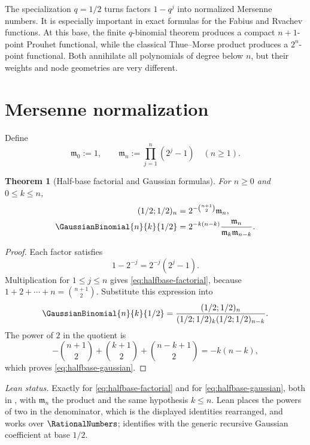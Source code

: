 \documentclass[11pt,a4paper,oneside,openany]{book}
\newtheorem{theorem}{Theorem}[chapter]
\theoremstyle{definition}
\theoremstyle{remark}
\begin{document}
The specialization $q=1/2$ turns factors $1-q^j$ into normalized Mersenne numbers.  It is especially important in exact formulas for the Fabius and Rvachev functions.  At this base, the finite $q$-binomial theorem produces a compact $n+1$-point Prouhet functional, while the classical Thue--Morse product produces a $2^n$-point functional.  Both annihilate all polynomials of degree below $n$, but their weights and node geometries are very different.

\section{Mersenne normalization}

Define
\begin{equation}\label{eq:mersenne-product}
 \mathfrak m_0:=1,
 \qquad
 \mathfrak m_n:=\prod_{j=1}^{n}(2^j-1)
 \quad(n\ge1).
\end{equation}

\begin{theorem}[Half-base factorial and Gaussian formulas]\label{thm:halfbase-normalization}
For $n\ge0$ and $0\le k\le n$,
\begin{align}
 (1/2;1/2)_n
 &=2^{-\binom{n+1}{2}}\mathfrak m_n,
 \label{eq:halfbase-factorial}\\
 \GaussianBinomial{n}{k}{1/2}
 &=2^{-k(n-k)}
   \frac{\mathfrak m_n}{\mathfrak m_k\mathfrak m_{n-k}}.
 \label{eq:halfbase-gaussian}
\end{align}
\end{theorem}

\begin{proof}
Each factor satisfies
\[
 1-2^{-j}=2^{-j}(2^j-1).
\]
Multiplication for $1\le j\le n$ gives \eqref{eq:halfbase-factorial}, because
$1+2+\cdots+n=\binom{n+1}{2}$.  Substitute this expression into
\[
 \GaussianBinomial{n}{k}{1/2}
 =\frac{(1/2;1/2)_n}{(1/2;1/2)_k(1/2;1/2)_{n-k}}.
\]
The power of $2$ in the quotient is
\[
 -\binom{n+1}{2}+\binom{k+1}{2}+\binom{n-k+1}{2}
 =-k(n-k),
\]
which proves \eqref{eq:halfbase-gaussian}.
\end{proof}
\emph{Lean status.}  Exactly  for \eqref{eq:halfbase-factorial} and
 for \eqref{eq:halfbase-gaussian}, both in , with
\(\mathfrak m_n\) the product  and the same hypothesis \(k\le n\).  Lean places the
powers of two in the denominator, which is the displayed identities rearranged, and works over \(\RationalNumbers\);
 identifies  with the generic recursive
Gaussian coefficient at base \(1/2\).
\end{document}

